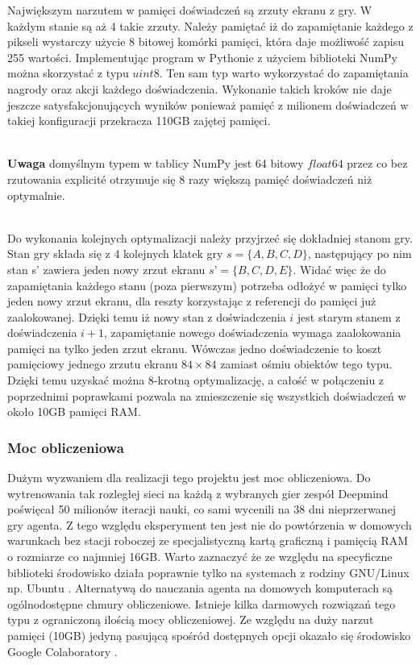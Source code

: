 \documentclass[12pt]{article}
\begin{document}
Największym narzutem w pamięci doświadczeń są zrzuty ekranu z gry. W każdym stanie są aż 4 takie zrzuty. Należy pamiętać iż do zapamiętanie każdego z pikseli wystarczy użycie 8 bitowej komórki pamięci, która daje możliwość zapisu 255 wartości. Implementując program w Pythonie z użyciem biblioteki NumPy można skorzystać z typu $uint8$. Ten sam typ warto wykorzystać do zapamiętania nagrody oraz akcji każdego doświadczenia. Wykonanie takich kroków nie daje jeszcze satysfakcjonujących wyników ponieważ pamięć z milionem doświadczeń w takiej konfiguracji przekracza 110GB zajętej pamięci.
\\\

 \textbf{Uwaga} domyślnym typem w tablicy NumPy jest 64 bitowy $float64$ przez co bez rzutowania explicité otrzymuje się 8 razy większą pamięć doświadczeń niż optymalnie. 
\\\

Do wykonania kolejnych optymalizacji należy przyjrzeć się dokładniej stanom gry. Stan gry składa się z 4 kolejnych klatek gry $s=\{A, B, C, D\}$, następujący po nim stan s’ zawiera jeden nowy zrzut ekranu $s’=\{B, C, D, E\}$. Widać więc że do zapamiętania każdego stanu (poza pierwszym)  potrzeba odłożyć w pamięci tylko jeden nowy zrzut ekranu, dla reszty korzystając z referencji do pamięci już zaalokowanej. Dzięki temu iż nowy stan z doświadczenia $i$ jest starym stanem z doświadczenia $i+1$, zapamiętanie nowego doświadczenia wymaga zaalokowania pamięci na tylko jeden zrzut ekranu. Wówczas jedno doświadczenie to koszt pamięciowy jednego zrzutu ekranu $84\times84$ zamiast ośmiu obiektów tego typu. Dzięki temu uzyskać można 8-krotną optymalizację, a całość w połączeniu z poprzednimi poprawkami pozwala na zmieszczenie się wszystkich doświadczeń w około 10GB pamięci RAM.

\subsubsection{Moc obliczeniowa}
Dużym wyzwaniem dla realizacji tego projektu jest moc obliczeniowa. Do wytrenowania tak rozległej sieci na każdą z wybranych gier zespół Deepmind \cite{deepmind_2} poświęcał 50 milionów iteracji nauki, co sami wycenili na 38 dni nieprzerwanej gry agenta. Z tego względu eksperyment ten jest nie do powtórzenia w domowych warunkach bez stacji roboczej ze specjalistyczną kartą graficzną i pamięcią RAM o rozmiarze co najmniej 16GB. Warto zaznaczyć że ze względu na specyficzne biblioteki \cite{gym} środowisko działa poprawnie tylko na systemach z rodziny GNU/Linux np. Ubuntu \cite{ubuntu}.  Alternatywą do nauczania agenta na domowych komputerach są ogólnodostępne chmury obliczeniowe. Istnieje kilka darmowych rozwiązań tego typu z ograniczoną ilością mocy obliczeniowej. Ze względu na duży narzut pamięci (10GB) jedyną pasującą spośród dostępnych opcji okazało się środowisko Google Colaboratory \cite{colab}. 
\\\
\end{document}
